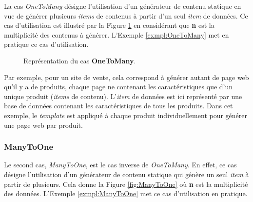 			La cas \textit{OneToMany} désigne l'utilisation d'un générateur de contenu statique en vue de générer plusieurs \textit{items} de contenus à partir d'un seul \textit{item} de données. Ce cas d'utilisation est illustré par la Figure \ref{fig:OneToMany} en considérant que \textbf{n} est la multiplicité des contenus à générer. L'Exemple \ref{exmpl:OneToMany} met en pratique ce cas d'utilisation.
			
			\begin{figure}[!]
				\begin{center}
					\caption{Représentation du cas \textbf{OneToMany}.}
					\label{fig:OneToMany}
				\end{center}
			\end{figure}
			
			\begin{exmpl}
				\label{exmpl:OneToMany}
				 Par exemple, pour un site de vente, cela correspond à générer autant de page web qu'il y a de produits, chaque page ne contenant les caractéristiques que d'un unique produit (\textit{items} de contenu). L'\textit{item} de données est ici représenté par une base de données contenant les caractéristiques de tous les produits. Dans cet exemple, le \textit{template} est appliqué à chaque produit individuellement pour générer une page web par produit.
			\end{exmpl}
		
		\subsubsection*{ManyToOne}
		
			Le second cas, \textit{ManyToOne}, est le cas inverse de \textit{OneToMany}. En effet, ce cas désigne l'utilisation d'un générateur de contenu statique qui génère un seul \textit{item} à partir de plusieurs. Cela donne la Figure \ref{fig:ManyToOne} où \textbf{n} est la multiplicité des données. L'Exemple \ref{exmpl:ManyToOne} met ce cas d'utilisation en pratique.
			
